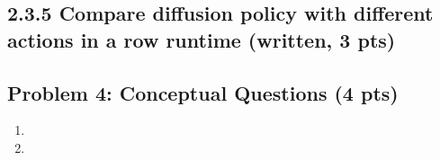 \documentclass[12pt]{article}
\begin{document}
\subsection*{2.3.5 Compare diffusion policy with different actions in a row runtime (written, 3 pts)}
\begin{tcolorbox}[fit,height=10em, width=40em, blank, borderline={1pt}{1pt},nobeforeafter]
            \begin{center}
            \begin{solution}

            \end{solution}
            \end{center}
            \end{tcolorbox}

\clearpage




 
\subsection*{Problem 4: Conceptual Questions (4 pts)}

\begin{tcolorbox}[fit,height=22em, width=40em, blank, borderline={1pt}{1pt},nobeforeafter]
\begin{center}
\begin{solution}
\begin{enumerate}
    \item 
    \item 
\end{enumerate}
\end{solution}
\end{center}
\end{tcolorbox}
\end{document}
